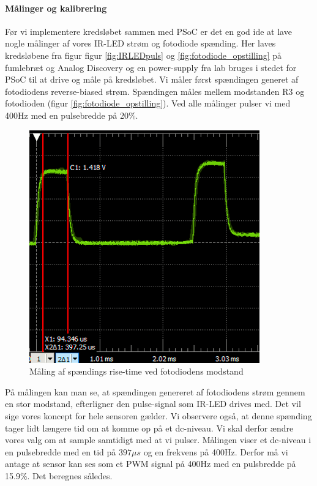 \documentclass[HardwareDesign/HardwareDesign_main.tex]{subfiles}
\begin{document}
\paragraph{Målinger og kalibrering}
\newline
\newline
Før vi implementere kredsløbet sammen med PSoC er det en god ide at lave nogle målinger af vores IR-LED strøm og fotodiode spænding. Her laves kredsløbene fra figur figur \ref{fig:IRLEDpuls} og \ref{fig:fotodiode_opstilling} på fumlebræt og Analog Discovery og en power-supply fra lab bruges i stedet for PSoC til at drive og måle på kredsløbet. Vi måler først spændingen generet af fotodiodens reverse-biased strøm. Spændingen måles mellem modstanden R3 og fotodioden (figur \ref{fig:fotodiode_opstilling}). Ved alle målinger pulser vi med 400Hz med en pulsebredde på 20\%.
\newpage
\begin{figure}
    \centering
    \includegraphics{HardwareDesign/Bolddispenser/graphics/Maling1.png}
    \caption{Måling af spændings rise-time ved fotodiodens modstand}
    \label{fig:Måling1_AD}
\end{figure}
På målingen kan man se, at spændingen genereret af fotodiodens strøm gennem en stor modstand, efterligner den pulse-signal som IR-LED drives med. Det vil sige vores koncept for hele sensoren gælder. Vi observere også, at denne spænding tager lidt længere tid om at komme op på et dc-niveau. Vi skal derfor ændre vores valg om at sample samtidigt med at vi pulser. Målingen viser et dc-niveau i en pulsebredde med en tid på $397\mu s$ og en frekvens på 400Hz. Derfor må vi antage at sensor kan ses som et PWM signal på 400Hz med en pulsbredde på 15.9\%. Det beregnes således.
\end{document}
